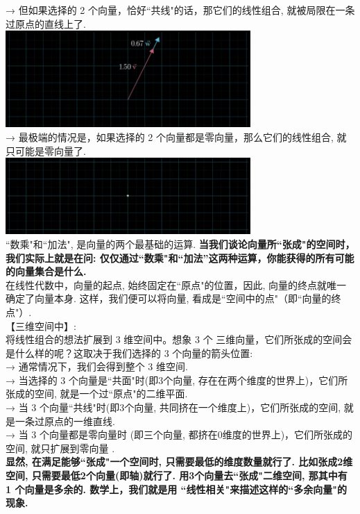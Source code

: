\documentclass[UTF8]{ctexart}
\begin{document}
→ 但如果选择的 2 个向量，恰好``共线"的话，那它们的线性组合, 就被局限在一条过原点的直线上了. \\
\includegraphics[width=0.7\textwidth]{img/0105.png}\\

→ 最极端的情况是，如果选择的 2 个向量都是零向量，那么它们的线性组合, 就只可能是零向量了. \\
\includegraphics[width=0.7\textwidth]{img/0106.png}\\

``数乘"和``加法", 是向量的两个最基础的运算. \textbf{当我们谈论向量所``张成"的空间时，我们实际上就是在问: 仅仅通过``数乘"和``加法''这两种运算，你能获得的所有可能的向量集合是什么.} \\

在线性代数中，向量的起点, 始终固定在``原点"的位置，因此, 向量的终点就唯一确定了向量本身. 这样，我们便可以将向量, 看成是``空间中的点"（即``向量的终点"）.\\


【三维空间中】:\\
将线性组合的想法扩展到 3 维空间中。想象 3 个 三维向量，它们所张成的空间会是什么样的呢？这取决于我们选择的 3 个向量的箭头位置:\\

→ 通常情况下，我们会得到整个 3 维空间. \\
→ 当选择的 3 个向量是``共面"时(即3个向量, 存在在两个维度的世界上)，它们所张成的空间, 就是一个过``原点"的二维平面. \\
→ 当 3 个向量``共线"时(即3个向量, 共同挤在一个维度上)，它们所张成的空间, 就是一条过原点的一维直线. \\
→ 当 3 个向量都是零向量时 (即三个向量, 都挤在0维度的世界上)，它们所张成的空间, 就只扩展到零向量 .\\

\textbf{显然, 在满足能够``张成"一个空间时, 只需要最低的维度数量就行了. 比如张成2维空间, 只需要最低2个向量(即轴)就行了. 用3个向量去``张成"二维空间, 那其中有 1 个向量是多余的.  数学上，我们就是用 \hypertarget{超链接定位符}{``线性相关"}来描述这样的``多余向量"的现象.}  \\
\end{document}
